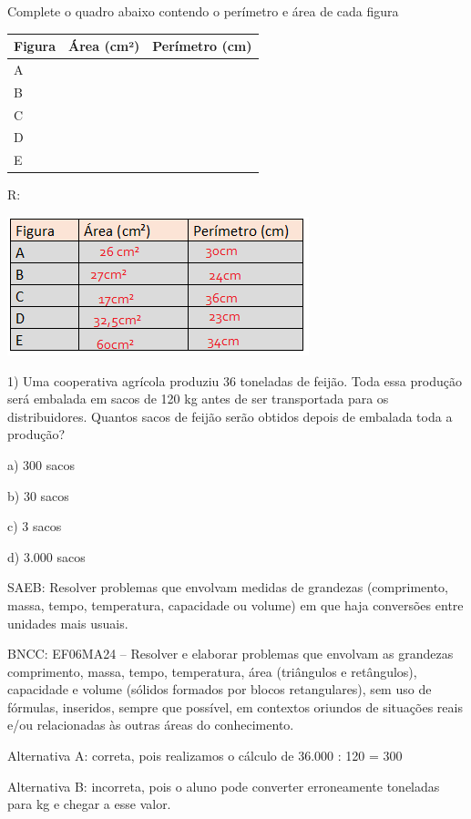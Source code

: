 Complete o quadro abaixo contendo o perímetro e área de cada figura


\begin{longtable}[]{@{}lll@{}}
\toprule
Figura & Área (cm²) & Perímetro (cm)\tabularnewline
\midrule
\endhead
A & ~ & ~\tabularnewline
B & ~ & ~\tabularnewline
C & ~ & ~\tabularnewline
D & ~ & ~\tabularnewline
E & ~ & ~\tabularnewline
\bottomrule
\end{longtable}

R:

\includegraphics[width=3.44792in,height=1.58333in]{./imgSAEB_6_MAT/media/image99.png}


1) Uma cooperativa agrícola produziu 36 toneladas de feijão. Toda essa
produção será embalada em sacos de 120 kg antes de ser transportada para
os distribuidores. Quantos sacos de feijão serão obtidos depois de
embalada toda a produção?

a) 300 sacos

b) 30 sacos

c) 3 sacos

d) 3.000 sacos

SAEB: Resolver problemas que envolvam medidas de grandezas (comprimento,
massa, tempo, temperatura, capacidade ou volume) em que haja conversões
entre unidades mais usuais.

BNCC: EF06MA24 -- Resolver e elaborar problemas que envolvam as
grandezas comprimento, massa, tempo, temperatura, área (triângulos e
retângulos), capacidade e volume (sólidos formados por blocos
retangulares), sem uso de fórmulas, inseridos, sempre que possível, em
contextos oriundos de situações reais e/ou relacionadas às outras áreas
do conhecimento.

Alternativa A: correta, pois realizamos o cálculo de 36.000 : 120 = 300

Alternativa B: incorreta, pois o aluno pode converter erroneamente
toneladas para kg e chegar a esse valor.

